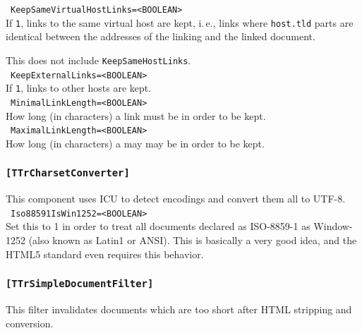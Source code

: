 \documentclass[12pt,a4paper]{article}
\begin{document}
\noindent\textbullet~\texttt{KeepSameVirtualHostLinks=<BOOLEAN>}\\

If \texttt{1}, links to the same virtual host are kept, i.\,e., links where \texttt{host.tld} parts are identical between the addresses of the linking and the  linked document.

This does not include \texttt{KeepSameHostLinks}.\\

\noindent\textbullet~\texttt{KeepExternalLinks=<BOOLEAN>}\\

If \texttt{1}, links to other hosts are kept.\\

\noindent\textbullet~\texttt{MinimalLinkLength=<BOOLEAN>}\\

How long (in characters) a link must be in order to be kept.\\

\noindent\textbullet~\texttt{MaximalLinkLength=<BOOLEAN>}\\

How long (in characters) a may may be in order to be kept.\\

\subsubsection{\texttt{[TTrCharsetConverter]}}
\label{sec:charsetconverter}

This component uses ICU to detect encodings and convert them all to UTF-8.\\

\noindent\textbullet~\texttt{Iso88591IsWin1252=<BOOLEAN>}\\

Set this to 1 in order to treat all documents declared as ISO-8859-1 as Window-1252 (also known as Latin1 or ANSI).
This is basically a very good idea, and the HTML5 standard even requires this behavior.\\


\subsubsection{\texttt{[TTrSimpleDocumentFilter]}}
\label{sec:simplefilter}

This filter invalidates documents which are too short after HTML stripping and conversion.\\
\end{document}
